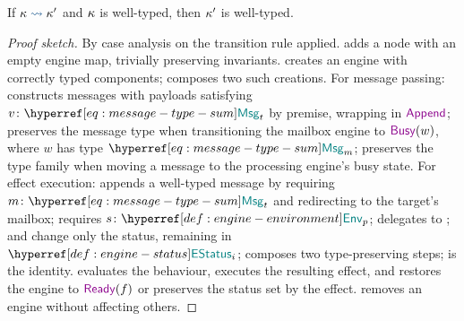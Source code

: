\documentclass[
  a4paper,        %
  techreport,     %
]{art}
\begin{document}
\begin{proposition}\label{prop:type-preservation}%
If $\sysstep{\SystemState}{\SystemState'}$ and $\kappa$ is well-typed,
then $\kappa'$ is well-typed.
\end{proposition}
\begin{proof}[Proof sketch]\sloppy%
By case analysis on the transition rule applied.
 adds a node with an empty engine map, trivially preserving
invariants.
 creates an engine with correctly typed components;
 composes two such creations.
For message passing:  constructs messages with payloads
satisfying $\typing{v}{\msgtype{t}}$ by premise, wrapping in $\append$;
 preserves the message type when transitioning the mailbox
engine to $\busy{w}$, where $w$ has type $\msgtype{m}$;
 preserves the type family when moving a message to the
processing engine's busy state.
For effect execution:  appends a well-typed message by
requiring $\typing{m}{\msgtype{t}}$ and redirecting to the target's mailbox;
 requires $\typing{s}{\envtype{p}}$;
 delegates to ; 
and  change only the status, remaining in
$\EngineStatus{i}$;  composes two type-preserving steps;
 is the identity.  evaluates the behaviour,
executes the resulting effect, and restores the engine to $\ready{f}$ or
preserves the status set by the effect.  removes an engine
without affecting others.
\end{proof}
\end{document}
